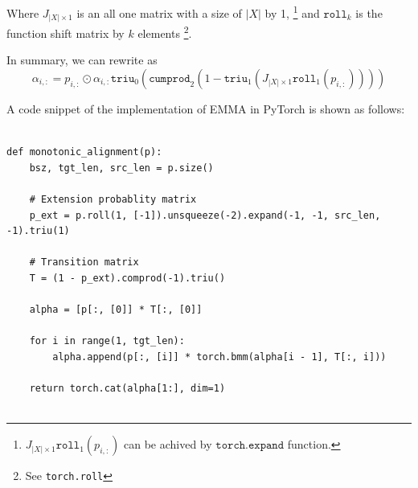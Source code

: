 Where $J_{|X| \times 1}$ is an all one matrix with a size of $|X|$ by 1,
\footnote{$J_{|X| \times 1} \texttt{roll}_1(p_{i,:})$ can be achived by $\texttt{torch.expand}$ function.}
and $\texttt{roll}_k$ is the function shift matrix by $k$ elements \footnote{See \texttt{torch.roll}}.

In summary, we can rewrite  as
\begin{equation}
    \alpha_{i,:} = p_{i,:} \odot \alpha_{i, :} \texttt{triu}_0\left(\texttt{cumprod}_2(1 - \texttt{triu}_1\left( J_{|X| \times 1} \texttt{roll}_1(p_{i,:}) \right))\right)
\end{equation}

A code snippet of the implementation of EMMA in PyTorch is shown as follows: 
\begin{verbatim}

def monotonic_alignment(p):
    bsz, tgt_len, src_len = p.size()

    # Extension probablity matrix
    p_ext = p.roll(1, [-1]).unsqueeze(-2).expand(-1, -1, src_len, -1).triu(1)

    # Transition matrix
    T = (1 - p_ext).comprod(-1).triu()

    alpha = [p[:, [0]] * T[:, [0]]

    for i in range(1, tgt_len):
        alpha.append(p[:, [i]] * torch.bmm(alpha[i - 1], T[:, i]))
        
    return torch.cat(alpha[1:], dim=1)


\end{verbatim}

